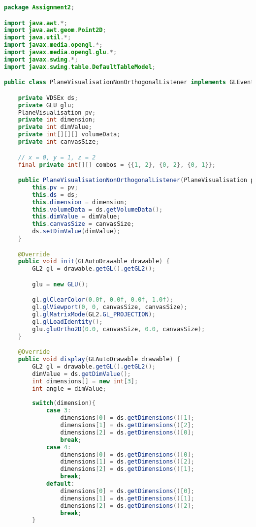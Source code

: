 \documentclass[pdftex,a4paper,10pt,titlepage]{article}
\begin{document}
\begin{lstlisting}[language=java, breaklines=true]
package Assignment2;

import java.awt.*;
import java.awt.geom.Point2D;
import java.util.*;
import javax.media.opengl.*;
import javax.media.opengl.glu.*;
import javax.swing.*;
import javax.swing.table.DefaultTableModel;

public class PlaneVisualisationNonOrthogonalListener implements GLEventListener {

    private VDSEx ds;
    private GLU glu;
    PlaneVisualisation pv;
    private int dimension;
    private int dimValue;
    private int[][][] volumeData;
    private int canvasSize;

    // x = 0, y = 1, z = 2
    final private int[][] combos = {{1, 2}, {0, 2}, {0, 1}};

    public PlaneVisualisationNonOrthogonalListener(PlaneVisualisation pv, VDSEx ds, int dimension, int dimValue, int canvasSize) {
        this.pv = pv;
        this.ds = ds;
        this.dimension = dimension;
        this.volumeData = ds.getVolumeData();
        this.dimValue = dimValue;
        this.canvasSize = canvasSize;
        ds.setDimValue(dimValue);
    }

    @Override
    public void init(GLAutoDrawable drawable) {
        GL2 gl = drawable.getGL().getGL2();

        glu = new GLU();

        gl.glClearColor(0.0f, 0.0f, 0.0f, 1.0f);
        gl.glViewport(0, 0, canvasSize, canvasSize);
        gl.glMatrixMode(GL2.GL_PROJECTION);
        gl.glLoadIdentity();
        glu.gluOrtho2D(0.0, canvasSize, 0.0, canvasSize);
    }

    @Override
    public void display(GLAutoDrawable drawable) {
        GL2 gl = drawable.getGL().getGL2();
        dimValue = ds.getDimValue();
        int dimensions[] = new int[3];
        int angle = dimValue;
        
        switch(dimension){
            case 3:
                dimensions[0] = ds.getDimensions()[1];
                dimensions[1] = ds.getDimensions()[2];
                dimensions[2] = ds.getDimensions()[0];
                break;
            case 4:
                dimensions[0] = ds.getDimensions()[0];
                dimensions[1] = ds.getDimensions()[2];
                dimensions[2] = ds.getDimensions()[1];
                break;
            default:
                dimensions[0] = ds.getDimensions()[0];
                dimensions[1] = ds.getDimensions()[1];
                dimensions[2] = ds.getDimensions()[2];
                break;
        }


\end{lstlisting}
\end{document}
